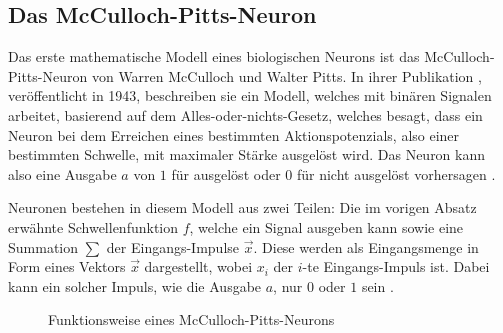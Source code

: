 \documentclass[12pt,titlepage]{article}
\begin{document}
\subsection{Das McCulloch-Pitts-Neuron}

Das erste mathematische Modell eines biologischen Neurons ist das McCulloch-Pitts-Neuron von Warren McCulloch und Walter Pitts. In ihrer Publikation \autocite{mccullochLogicalCalculusIdeas1943}, veröffentlicht in 1943, beschreiben sie ein Modell, welches mit binären Signalen arbeitet, basierend auf dem Alles-oder-nichts-Gesetz, welches besagt, dass ein Neuron bei dem Erreichen eines bestimmten Aktionspotenzials, also einer bestimmten Schwelle, mit maximaler Stärke ausgelöst wird. Das Neuron kann also eine Ausgabe \(a\) von \(1\) für ausgelöst oder \(0\) für nicht ausgelöst vorhersagen \autocite{chandraMcCullochPittsNeuronMankind2022}.

Neuronen bestehen in diesem Modell aus zwei Teilen: Die im vorigen Absatz erwähnte Schwellenfunktion \(f\), welche ein Signal ausgeben kann sowie eine Summation \(\sum\) der Eingangs-Impulse \(\vec{x}\). Diese werden als Eingangsmenge in Form eines Vektors \(\vec{x}\) dargestellt, wobei \(x_i\) der \(i\)-te Eingangs-Impuls ist. Dabei kann ein solcher Impuls, wie die Ausgabe \(a\), nur \(0\) oder \(1\) sein \autocite{chandraMcCullochPittsNeuronMankind2022}.

\begin{figure}[H]
  \centering


  \caption{Funktionsweise eines McCulloch-Pitts-Neurons}
  \label{fig:McCullochPitts}
\end{figure}
\end{document}
